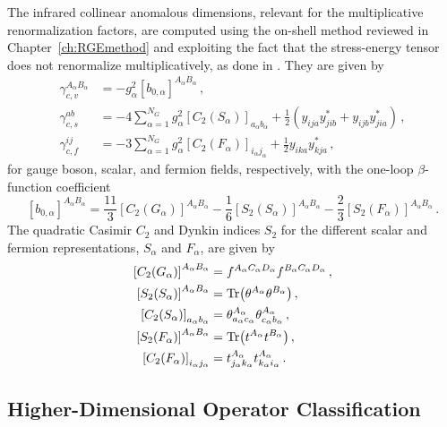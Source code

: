 The infrared collinear anomalous dimensions, relevant for the multiplicative renormalization factors, are computed using the on-shell method reviewed in Chapter~\ref{ch:RGEmethod} and exploiting the fact that the stress-energy tensor does not renormalize multiplicatively, as done in \cite{Caron-Huot:2016cwu,EliasMiro:2020tdv,AccettulliHuber:2021uoa,Bresciani:2024shu,Baratella:2022nog,Aebischer:2025zxg}.
They are given by
\begin{align}
    \gamma_{c,v}^{A_\alpha B_\alpha} &= -g_\alpha^2 \left[b_{0,\alpha}\right]^{A_\alpha B_\alpha} \,, \label{eq:coll_vector}  \\
    \gamma_{c,s}^{ab} &= -4\sum_{\alpha=1}^{N_G} g_\alpha^2 \left[C_2(S_\alpha)\right]_{a_{\alpha}b_{\alpha}} + \frac{1}{2}\left( y_{ija}y_{jib}^*+y_{ijb}y_{jia}^* \right) \,, \label{eq:coll_scalar} \\
    \gamma_{c,f}^{ij} &= -3\sum_{\alpha=1}^{N_G} g_\alpha^2 \left[C_2(F_\alpha)\right]_{i_\alpha j_\alpha}+\frac{1}{2}y_{ika}y^*_{kja} \,, \label{eq:coll_fermion}
\end{align}
for gauge boson, scalar, and fermion fields, respectively,
with the one-loop $\beta$-function coefficient
\begin{equation}
    \left[b_{0,\alpha}\right]^{A_\alpha B_\alpha} = \frac{11}{3}[C_2(G_\alpha)]^{A_\alpha B_\alpha} - \frac{1}{6} [S_2(S_\alpha)]^{A_\alpha B_\alpha} -\frac{2}{3}[S_2(F_\alpha)]^{A_\alpha B_\alpha}\,.
\end{equation}
The quadratic Casimir $C_2$ and Dynkin indices $S_2$ for the different scalar and fermion representations, $S_\alpha$ and $F_\alpha$, are given by
\begin{align}
    \left[C_2(G_\alpha)\right]^{A_\alpha B_\alpha} &= f^{A_\alpha C_\alpha D_\alpha}f^{B_\alpha C_\alpha D_\alpha}\,,\\
    \left[S_2(S_\alpha)\right]^{A_\alpha B_\alpha} &= \Tr(\theta^{A_\alpha}\theta^{B_\alpha})\,, \\ 
    \left[C_2(S_\alpha)\right]_{a_{\alpha}b_{\alpha}} &= \theta^{A_\alpha}_{a_{\alpha}c_{\alpha}} \theta^{A_\alpha}_{c_{\alpha}b_{\alpha}}\,,\\
    \left[S_2(F_\alpha)\right]^{A_\alpha B_\alpha} &= \Tr(t^{A_\alpha}t^{B_\alpha})\,, \\
    \left[C_2(F_\alpha)\right]_{i_{\alpha}j_{\alpha}} &= t^{A_\alpha}_{j_{\alpha}k_{\alpha}} t^{A_\alpha}_{k_{\alpha}i_{\alpha}}\,.
\end{align}

\subsection{Higher-Dimensional Operator Classification}

